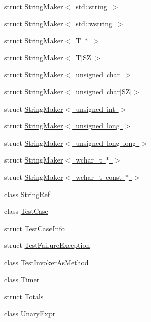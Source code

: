 \begin{DoxyCompactItemize}
\item 
struct \mbox{\hyperlink{struct_catch_1_1_string_maker_3_01std_1_1string_01_4}{String\+Maker$<$ std\+::string $>$}}
\item 
struct \mbox{\hyperlink{struct_catch_1_1_string_maker_3_01std_1_1wstring_01_4}{String\+Maker$<$ std\+::wstring $>$}}
\item 
struct \mbox{\hyperlink{struct_catch_1_1_string_maker_3_01_t_01_5_01_4}{String\+Maker$<$ T $\ast$ $>$}}
\item 
struct \mbox{\hyperlink{struct_catch_1_1_string_maker_3_01_t[_s_z]_4}{String\+Maker$<$ T\mbox{[}\+S\+Z\mbox{]}$>$}}
\item 
struct \mbox{\hyperlink{struct_catch_1_1_string_maker_3_01unsigned_01char_01_4}{String\+Maker$<$ unsigned char $>$}}
\item 
struct \mbox{\hyperlink{struct_catch_1_1_string_maker_3_01unsigned_01char[_s_z]_4}{String\+Maker$<$ unsigned char\mbox{[}\+S\+Z\mbox{]}$>$}}
\item 
struct \mbox{\hyperlink{struct_catch_1_1_string_maker_3_01unsigned_01int_01_4}{String\+Maker$<$ unsigned int $>$}}
\item 
struct \mbox{\hyperlink{struct_catch_1_1_string_maker_3_01unsigned_01long_01_4}{String\+Maker$<$ unsigned long $>$}}
\item 
struct \mbox{\hyperlink{struct_catch_1_1_string_maker_3_01unsigned_01long_01long_01_4}{String\+Maker$<$ unsigned long long $>$}}
\item 
struct \mbox{\hyperlink{struct_catch_1_1_string_maker_3_01wchar__t_01_5_01_4}{String\+Maker$<$ wchar\+\_\+t $\ast$ $>$}}
\item 
struct \mbox{\hyperlink{struct_catch_1_1_string_maker_3_01wchar__t_01const_01_5_01_4}{String\+Maker$<$ wchar\+\_\+t const $\ast$ $>$}}
\item 
class \mbox{\hyperlink{class_catch_1_1_string_ref}{String\+Ref}}
\item 
class \mbox{\hyperlink{class_catch_1_1_test_case}{Test\+Case}}
\item 
struct \mbox{\hyperlink{struct_catch_1_1_test_case_info}{Test\+Case\+Info}}
\item 
struct \mbox{\hyperlink{struct_catch_1_1_test_failure_exception}{Test\+Failure\+Exception}}
\item 
class \mbox{\hyperlink{class_catch_1_1_test_invoker_as_method}{Test\+Invoker\+As\+Method}}
\item 
class \mbox{\hyperlink{class_catch_1_1_timer}{Timer}}
\item 
struct \mbox{\hyperlink{struct_catch_1_1_totals}{Totals}}
\item 
class \mbox{\hyperlink{class_catch_1_1_unary_expr}{Unary\+Expr}}
\end{DoxyCompactItemize}
